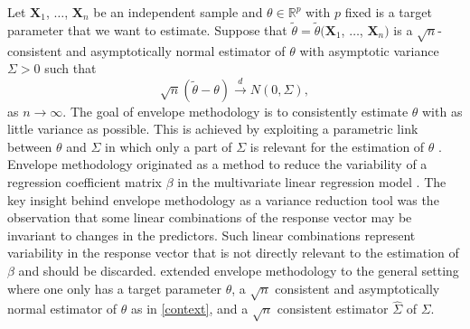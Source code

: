 \documentclass{article}\usepackage[]{graphicx}\usepackage[]{color}
\newcommand{\R}{\mathbb{R}}
\newcommand{\Ttil}{\widetilde{\theta}}
\newcommand{\Sigmahat}{\widehat{\Sigma}}
\newcommand{\rootn}{\sqrt{n}}
\newcommand{\X}{\mathbf{X}}
\begin{document}
Let $\X_1$, $\ldots$, $\X_n$ be an independent sample and $\theta \in \R^p$ with $p$ fixed is a target parameter that we want to estimate. Suppose that $\Ttil = \Ttil(\X_1$, $\ldots$, $\X_n)$ is a $\rootn$-consistent and asymptotically normal estimator of $\theta$ with asymptotic variance $\Sigma > 0$ such that  
\begin{equation}
  \rootn\left(\Ttil - \theta\right) \overset{d}{\to} N(0, \Sigma),
\label{context}
\end{equation}
as $n \to \infty$. The goal of envelope methodology is to consistently estimate $\theta$ with as little variance as possible. This is achieved by exploiting a parametric link between $\theta$ and $\Sigma$ in which only a part of $\Sigma$ is relevant for the estimation of $\theta$ \citep{cook2010, found, cook2018introduction}. Envelope methodology originated as a method to reduce the variability of a regression coefficient matrix $\beta$ in the multivariate linear regression model \citep{cook2010, su, su-inner, cook-scale, cook2018introduction}. The key insight behind envelope methodology as a variance reduction tool was the observation that some linear combinations of the response vector may be invariant to changes in the predictors. Such linear combinations represent variability in the response vector that is not directly relevant to the estimation of $\beta$ and should be discarded. \cite{found} extended envelope methodology to the general setting where one only has a target parameter $\theta$, a $\rootn$ consistent and asymptotically normal estimator of $\theta$ as in \eqref{context}, and a $\rootn$ consistent estimator $\Sigmahat$ of $\Sigma$. 
\end{document}
